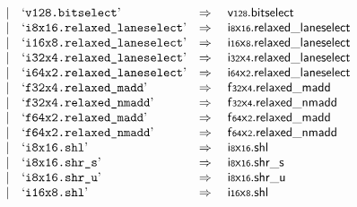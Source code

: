 $$\begin{array}[t]{@{}lrrl@{}l@{}l@{}l@{}}
& & | & \mbox{‘\texttt{v128.bitselect}’} & \quad\Rightarrow\quad{} & \mathsf{v{\scriptstyle 128}} {.} \mathsf{bitselect} \\
& & | & \mbox{‘\texttt{i8x16.relaxed\_laneselect}’} & \quad\Rightarrow\quad{} & {\mathsf{i{\scriptstyle 8}}}{\mathsf{x}}{\mathsf{{\scriptstyle 16}}} {.} \mathsf{relaxed\_laneselect} \\
& & | & \mbox{‘\texttt{i16x8.relaxed\_laneselect}’} & \quad\Rightarrow\quad{} & {\mathsf{i{\scriptstyle 16}}}{\mathsf{x}}{\mathsf{{\scriptstyle 8}}} {.} \mathsf{relaxed\_laneselect} \\
& & | & \mbox{‘\texttt{i32x4.relaxed\_laneselect}’} & \quad\Rightarrow\quad{} & {\mathsf{i{\scriptstyle 32}}}{\mathsf{x}}{\mathsf{{\scriptstyle 4}}} {.} \mathsf{relaxed\_laneselect} \\
& & | & \mbox{‘\texttt{i64x2.relaxed\_laneselect}’} & \quad\Rightarrow\quad{} & {\mathsf{i{\scriptstyle 64}}}{\mathsf{x}}{\mathsf{{\scriptstyle 2}}} {.} \mathsf{relaxed\_laneselect} \\
& & | & \mbox{‘\texttt{f32x4.relaxed\_madd}’} & \quad\Rightarrow\quad{} & {\mathsf{f{\scriptstyle 32}}}{\mathsf{x}}{\mathsf{{\scriptstyle 4}}} {.} \mathsf{relaxed\_madd} \\
& & | & \mbox{‘\texttt{f32x4.relaxed\_nmadd}’} & \quad\Rightarrow\quad{} & {\mathsf{f{\scriptstyle 32}}}{\mathsf{x}}{\mathsf{{\scriptstyle 4}}} {.} \mathsf{relaxed\_nmadd} \\
& & | & \mbox{‘\texttt{f64x2.relaxed\_madd}’} & \quad\Rightarrow\quad{} & {\mathsf{f{\scriptstyle 64}}}{\mathsf{x}}{\mathsf{{\scriptstyle 2}}} {.} \mathsf{relaxed\_madd} \\
& & | & \mbox{‘\texttt{f64x2.relaxed\_nmadd}’} & \quad\Rightarrow\quad{} & {\mathsf{f{\scriptstyle 64}}}{\mathsf{x}}{\mathsf{{\scriptstyle 2}}} {.} \mathsf{relaxed\_nmadd} \\
& & | & \mbox{‘\texttt{i8x16.shl}’} & \quad\Rightarrow\quad{} & {\mathsf{i{\scriptstyle 8}}}{\mathsf{x}}{\mathsf{{\scriptstyle 16}}} {.} \mathsf{shl} \\
& & | & \mbox{‘\texttt{i8x16.shr\_s}’} & \quad\Rightarrow\quad{} & {\mathsf{i{\scriptstyle 8}}}{\mathsf{x}}{\mathsf{{\scriptstyle 16}}} {.} {\mathsf{shr}}{\mathsf{\_}}{\mathsf{s}} \\
& & | & \mbox{‘\texttt{i8x16.shr\_u}’} & \quad\Rightarrow\quad{} & {\mathsf{i{\scriptstyle 8}}}{\mathsf{x}}{\mathsf{{\scriptstyle 16}}} {.} {\mathsf{shr}}{\mathsf{\_}}{\mathsf{u}} \\
& & | & \mbox{‘\texttt{i16x8.shl}’} & \quad\Rightarrow\quad{} & {\mathsf{i{\scriptstyle 16}}}{\mathsf{x}}{\mathsf{{\scriptstyle 8}}} {.} \mathsf{shl} \\

\end{array}$$
